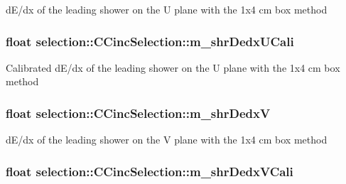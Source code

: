 d\-E/dx of the leading shower on the U plane with the 1x4 cm box method \hypertarget{classselection_1_1CCincSelection_abd57a8d6290e142e526636a4ec851801}{
\subsubsection[{m\-\_\-shr\-Dedx\-U\-Cali}]{\setlength{\rightskip}{0pt plus 5cm}float selection\-::\-C\-Cinc\-Selection\-::m\-\_\-shr\-Dedx\-U\-Cali\hspace{0.3cm}{\ttfamily [private]}}}\label{classselection_1_1CCincSelection_abd57a8d6290e142e526636a4ec851801}
Calibrated d\-E/dx of the leading shower on the U plane with the 1x4 cm box method \hypertarget{classselection_1_1CCincSelection_a2d1f501922cf14e3d1f6fb8cc8e63173}{
\subsubsection[{m\-\_\-shr\-Dedx\-V}]{\setlength{\rightskip}{0pt plus 5cm}float selection\-::\-C\-Cinc\-Selection\-::m\-\_\-shr\-Dedx\-V\hspace{0.3cm}{\ttfamily [private]}}}\label{classselection_1_1CCincSelection_a2d1f501922cf14e3d1f6fb8cc8e63173}
d\-E/dx of the leading shower on the V plane with the 1x4 cm box method \hypertarget{classselection_1_1CCincSelection_a9c1276e1f839f39c0c36ca5359631863}{
\subsubsection[{m\-\_\-shr\-Dedx\-V\-Cali}]{\setlength{\rightskip}{0pt plus 5cm}float selection\-::\-C\-Cinc\-Selection\-::m\-\_\-shr\-Dedx\-V\-Cali\hspace{0.3cm}{\ttfamily [private]}}}\label{classselection_1_1CCincSelection_a9c1276e1f839f39c0c36ca5359631863}

